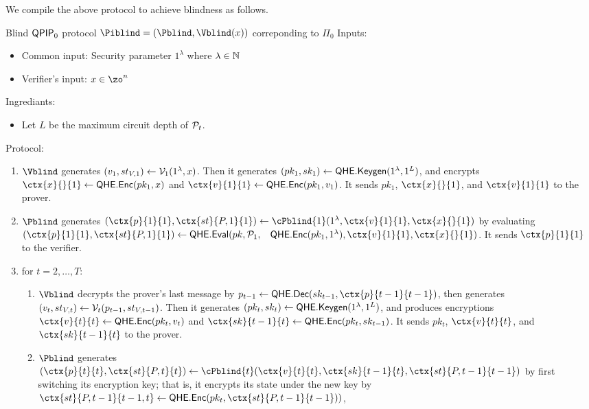 We compile the above protocol to achieve blindness as follows.

\begin{protocol}{Blind $\operatorname{\mathsf{QPIP}}_0$ protocol $\Piblind=(\Pblind, \Vblind(x))$ correponding to $\Pi_0$}
	Inputs:
	\begin{itemize}
		\item Common input: Security parameter $1^\lambda$ where $\lambda\in\mathbb{N}$
		\item Verifier's input: $x\in\zo^n$
	\end{itemize}

	Ingrediants:
	\begin{itemize}
		\item Let $L$ be the maximum circuit depth of $\mathcal{P}_t$.
	\end{itemize}

    Protocol:
	\begin{enumerate}
		\item $\Vblind$ generates $(v_1, st_{V, 1})\leftarrow\mathcal{V}_1(1^\lambda, x)$.
			Then it generates $(pk_1, sk_1)\leftarrow\mathsf{QHE.Keygen}(1^\lambda, 1^L)$,
			and encrypts $\ctx{x}{}{1}\leftarrow\QEnc(pk_1, x)$ and $\ctx{v}{1}{1}\leftarrow\QEnc(pk_1, v_1)$.
			It sends $pk_1$, $\ctx{x}{}{1}$, and $\ctx{v}{1}{1}$ to the prover.
		\item $\Pblind$ generates $(\ctx{p}{1}{1}, \ctx{st}{P, 1}{1})\leftarrow\cPblind{1}(1^\lambda, \ctx{v}{1}{1}, \ctx{x}{}{1})$
			by evaluating
			$(\ctx{p}{1}{1}, \ctx{st}{P, 1}{1})\leftarrow  \QEval(pk, \cP_1,$ \  $\QEnc(pk_1, 1^\lambda), \ctx{v}{1}{1}, \ctx{x}{}{1})$.
			It sends $\ctx{p}{1}{1}$ to the verifier.
		\item for $t=2,\ldots,T$:
		\begin{enumerate}
			\item $\Vblind$ decrypts the prover's last message by $p_{t-1}\leftarrow\QDec(sk_{t-1}, \ctx{p}{t-1}{t-1})$,
				then generates $(v_t, st_{V, t})\leftarrow\mathcal{V}_t(p_{t-1}, st_{V, t-1})$.
				Then it generates $(pk_t, sk_t)\leftarrow\mathsf{QHE.Keygen}(1^\lambda, 1^L)$,
				and produces encryptions $\ctx{v}{t}{t}\leftarrow\QEnc(pk_t, v_t)$ and $\ctx{sk}{t-1}{t}\leftarrow\QEnc(pk_t, sk_{t-1})$.
				It sends $pk_t$, $\ctx{v}{t}{t}$, and $\ctx{sk}{t-1}{t}$ to the prover.
			\item $\Pblind$ generates $(\ctx{p}{t}{t}, \ctx{st}{P, t}{t})\leftarrow\cPblind{t}(\ctx{v}{t}{t}, \ctx{sk}{t-1}{t}, \ctx{st}{P, t-1}{t-1})$
				by first switching its encryption key;
				that is, it encrypts its state under the new key by $\ctx{st}{P, t-1}{t-1, t}\leftarrow\QEnc(pk_t, \ctx{st}{P, t-1}{t-1}))$,

\end{enumerate}
\end{enumerate}
\end{protocol}
